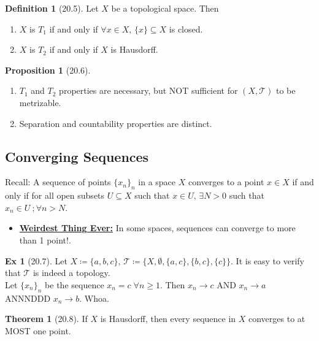 \documentclass{article}
\newcommand{\Iff}{if and only if}
\newcommand{\ts}{topological space}
\newcommand{\es}{\ensuremath{\emptyset}}
\newcommand{\coleq}{\ensuremath{\coloneqq}}
\newcommand{\define}[1]{\textbf{\underline{#1}}}
\newcommand{\tp}{\ensuremath{\mathcal{T}}}
\newcommand{\Ts}[2]{\ensuremath{(#1,#2)}}
\renewcommand{\Subset}{\subseteq}
\theoremstyle{definition}
\newtheorem*{defn}{Definition}
\newtheorem*{thm}{Theorem}
\newtheorem*{prop}{Proposition}
\newtheorem*{ex}{Ex}
\theoremstyle{remark}
\begin{document}
{        \begin{defn}[20.5]
            Let $X$ be a \ts{}. Then
            \begin{enumerate}
                \item $X$ is \define{$T_1$} \Iff{} $\forall x\in X, \, \{x\} \Subset X$ is closed.
                \item $X$ is \define{$T_2$} \Iff{} $X$ is Hausdorff.
            \end{enumerate}
        \end{defn}
    
        \begin{prop}[20.6]\hfill
            \begin{enumerate}
                \item $T_1$ and $T_2$ properties are necessary, but NOT sufficient for $\Ts{X}{\tp}$ to be metrizable.
                \item Separation and countability properties are distinct.
            \end{enumerate}
        \end{prop}
        
        \subsection*{Converging Sequences}{
            Recall: A sequence of points $\{x_n\}_n$ in a space $X$ converges to a point $x \in X$ \Iff{} for all open subsets $U \Subset X$ such that $x \in U, \, \exists N>0$ such that $x_n\in U\ ; \forall n>N$.
            \begin{itemize}
                \item \define{Weirdest Thing Ever:} In some spaces, sequences can converge to more than 1 point!.
            \end{itemize}
            
            \begin{ex}[20.7]
                Let $X\coleq\{a,b,c\}, \, \tp\coleq \{X,\es,\{a,c\},\{b,c\},\{c\}\}$. It is easy to verify that $\tp$ is indeed a topology.\\
                Let $\{x_n\}_n$ be the sequence $x_n=c \; \forall n \geq 1$. Then $x_n \to c$ AND $x_n \to a$ ANNNDDD $x_n \to b$. Whoa.
            \end{ex}
            
            \begin{thm}[20.8]
                If $X$ is Hausdorff, then every sequence in $X$ converges to at MOST one point.
            \end{thm}
        }
    }
\end{document}
